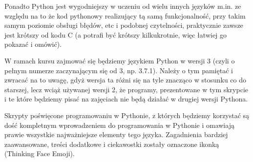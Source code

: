Ponadto Python jest wygodniejszy w uczeniu od wielu innych języków m.in. ze względu na to że
	kod pythonowy realizujący tą samą funkcjonalność, przy takim samym poziomie obsługi błędów, etc i podobnej czytelności,
	praktycznie zawsze jest krótszy od kodu C (a potrafi być krótszy kilkukrotnie, więc łatwiej go pokazać i omówić).

W ramach kursu zajmować się będziemy językiem Python w wersji 3 (czyli o pełnym numerze zaczynającym się od 3, np. 3.7.1).
Należy o tym pamiętać i zwracać na to uwagę, gdyż wersja ta różni się na tyle znacząco w stosunku co do starszej, lecz wciąż używanej wersji 2,
	że programy, prezentowane w tym skrypcie i te które będziemy pisać na zajęciach nie będą działać w drugiej wersji Pythona.

Skrypty poświęcone programowaniu w Pythonie, z których będziemy korzystać są dość kompletnym wprowadzeniem do programowania w Pythonie i omawiają prawie wszystkie najważniejsze elementy tego języka.
Zagadnienia bardziej zaawansowane, treści dodatkowe i ciekawostki zostały oznaczone ikonką {\Symbola 🤔} (Thinking Face Emoji).
